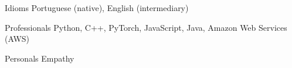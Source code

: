 
\begin{cvskills}
	\cvskill
	{Idioms}
	{Portuguese (native), English (intermediary)}

	\cvskill
	{Professionals}
	{Python, C++, PyTorch, JavaScript, Java, Amazon Web Services (AWS)}

	\cvskill
	{Personals}
	{Empathy}
\end{cvskills}
